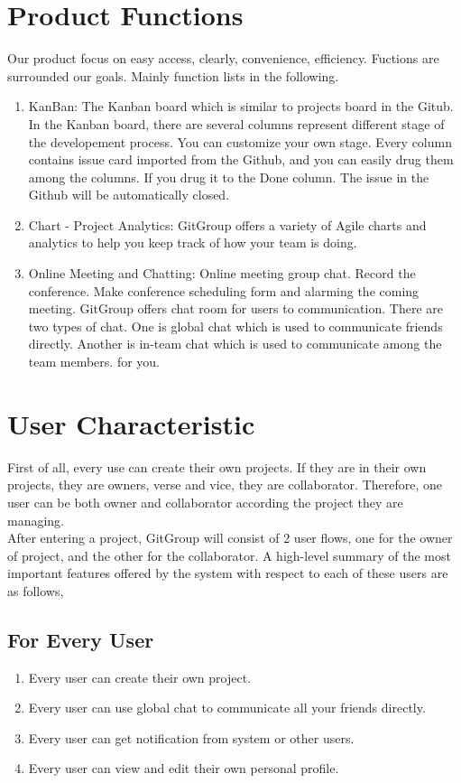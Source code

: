 \documentclass[12pt,a4paper]{report}
\begin{document}
\section{Product Functions}
Our product focus on easy access, clearly, convenience, efficiency. Fuctions are surrounded our goals. Mainly function lists in the following.
\begin{enumerate}
	\renewcommand{\labelenumi}{{\textbf{\arabic{enumi}.}}}

	\item KanBan:
	The Kanban board which is similar to projects board in the Gitub. In the Kanban board, there are several columns represent different stage of the developement process. You can customize your own stage. Every column contains issue card imported from the Github, and you can easily drug them among the columns. If you drug it to the Done column. The issue in the Github will be automatically closed.
	\item Chart - Project Analytics: 
	GitGroup offers a variety of Agile charts and analytics to help you keep track of how your team is doing. 
	\item Online Meeting and Chatting: 
	Online meeting group chat. Record the conference. Make conference scheduling form and alarming the coming meeting. GitGroup offers chat room for users to communication. There are two types of chat. One is global chat which is used to communicate friends directly. Another is in-team chat which is used to communicate among the team members. for you.
\end{enumerate}

\section{User Characteristic}
First of all, every use can create their own projects. If they are in their own projects, they are owners, verse and vice, they are collaborator. Therefore, one user can be both owner and collaborator according the project they are managing.\\
After entering a project, GitGroup will consist of 2 user flows, one for the owner of project, and the other for the collaborator. A high-level summary of the most important features offered by the system with respect to each of these users are as follows, 
	\subsection{For Every User}
	\begin{enumerate}
	\renewcommand{\labelenumi}{{\textbf{\arabic{enumi}.}}}
	\item Every user can create their own project.
	\item Every user can use global chat to communicate all your friends directly.
	\item Every user can get notification from system or other users.
	\item Every user can view and edit their own personal profile.
\end{enumerate}	 
\end{document}
